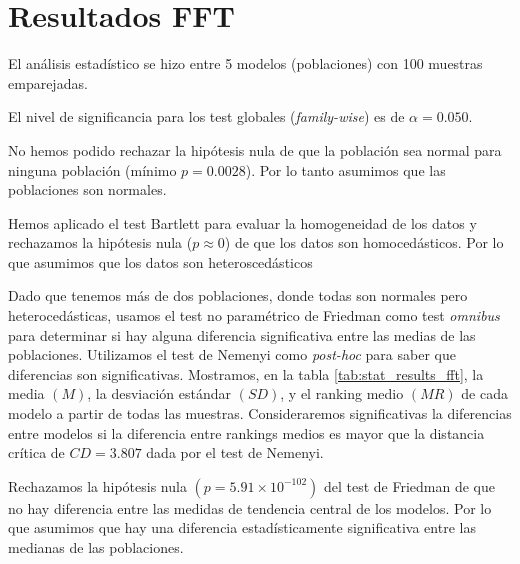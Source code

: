 \documentclass[a4paper,oneside,11pt,leqno]{article}
\begin{document}
	\section{Resultados FFT}
	\label{sec:results_fft}
	
	El análisis estadístico se hizo entre 5 modelos (poblaciones) con 100 muestras emparejadas.
	
	El nivel de significancia para los test globales (\textit{family-wise}) es de $\alpha=0.050$.
	
	No hemos podido rechazar la hipótesis nula de que la población sea normal para ninguna población (mínimo $p=0.0028$). Por lo tanto asumimos que las poblaciones son normales.
	
	Hemos aplicado el test Bartlett para evaluar la homogeneidad de los datos y rechazamos la hipótesis nula ($p\approx 0$) de que los datos son homocedásticos. Por lo que asumimos que los datos son heteroscedásticos
	
	Dado que tenemos más de dos poblaciones, donde todas son normales pero heterocedásticas, usamos el test no paramétrico de Friedman como test \textit{omnibus} para determinar si hay alguna diferencia significativa entre las medias de las poblaciones. Utilizamos el test de Nemenyi como \textit{post-hoc} para saber que diferencias son significativas. Mostramos, en la tabla \ref{tab:stat_results_fft}, la media $(M)$, la desviación estándar $(SD)$, y el ranking medio $(MR)$ de cada modelo a partir de todas las muestras. Consideraremos significativas la diferencias entre modelos si la diferencia entre rankings medios es mayor que la distancia crítica de $CD=3.807$ dada por el test de Nemenyi.
	
	Rechazamos la hipótesis nula $(p=5.91\times 10^{-102})$ del test de Friedman de que no hay diferencia entre las medidas de tendencia central de los modelos. Por lo que asumimos que hay una diferencia estadísticamente significativa entre las medianas de las poblaciones.
	
\end{document}
